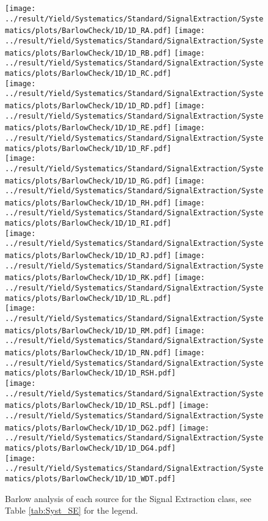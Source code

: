\begin{figure}
	\centering
		\texttt{[image: ../result/Yield/Systematics/Standard/SignalExtraction/Systematics/plots/BarlowCheck/1D/1D\_RA.pdf]}
		\texttt{[image: ../result/Yield/Systematics/Standard/SignalExtraction/Systematics/plots/BarlowCheck/1D/1D\_RB.pdf]}
		\texttt{[image: ../result/Yield/Systematics/Standard/SignalExtraction/Systematics/plots/BarlowCheck/1D/1D\_RC.pdf]}\\
		\texttt{[image: ../result/Yield/Systematics/Standard/SignalExtraction/Systematics/plots/BarlowCheck/1D/1D\_RD.pdf]}
		\texttt{[image: ../result/Yield/Systematics/Standard/SignalExtraction/Systematics/plots/BarlowCheck/1D/1D\_RE.pdf]}
		\texttt{[image: ../result/Yield/Systematics/Standard/SignalExtraction/Systematics/plots/BarlowCheck/1D/1D\_RF.pdf]}\\
		\texttt{[image: ../result/Yield/Systematics/Standard/SignalExtraction/Systematics/plots/BarlowCheck/1D/1D\_RG.pdf]}
		\texttt{[image: ../result/Yield/Systematics/Standard/SignalExtraction/Systematics/plots/BarlowCheck/1D/1D\_RH.pdf]}
		\texttt{[image: ../result/Yield/Systematics/Standard/SignalExtraction/Systematics/plots/BarlowCheck/1D/1D\_RI.pdf]}\\
		\texttt{[image: ../result/Yield/Systematics/Standard/SignalExtraction/Systematics/plots/BarlowCheck/1D/1D\_RJ.pdf]}
		\texttt{[image: ../result/Yield/Systematics/Standard/SignalExtraction/Systematics/plots/BarlowCheck/1D/1D\_RK.pdf]}
		\texttt{[image: ../result/Yield/Systematics/Standard/SignalExtraction/Systematics/plots/BarlowCheck/1D/1D\_RL.pdf]}\\
		\texttt{[image: ../result/Yield/Systematics/Standard/SignalExtraction/Systematics/plots/BarlowCheck/1D/1D\_RM.pdf]}
		\texttt{[image: ../result/Yield/Systematics/Standard/SignalExtraction/Systematics/plots/BarlowCheck/1D/1D\_RN.pdf]}
		\texttt{[image: ../result/Yield/Systematics/Standard/SignalExtraction/Systematics/plots/BarlowCheck/1D/1D\_RSH.pdf]}\\
		\texttt{[image: ../result/Yield/Systematics/Standard/SignalExtraction/Systematics/plots/BarlowCheck/1D/1D\_RSL.pdf]}
		\texttt{[image: ../result/Yield/Systematics/Standard/SignalExtraction/Systematics/plots/BarlowCheck/1D/1D\_DG2.pdf]}
		\texttt{[image: ../result/Yield/Systematics/Standard/SignalExtraction/Systematics/plots/BarlowCheck/1D/1D\_DG4.pdf]}\\
		\texttt{[image: ../result/Yield/Systematics/Standard/SignalExtraction/Systematics/plots/BarlowCheck/1D/1D\_WDT.pdf]}
		\caption{Barlow analysis of each source for the Signal Extraction class, see Table \ref{tab:Syst_SE} for the legend.}
		\label{fig:Barlow_SEX_1D}
\end{figure}

